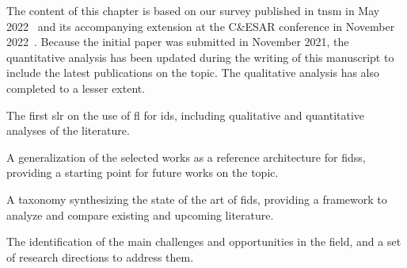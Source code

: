 The content of this chapter is based on our survey published in \gls{tnsm} in May 2022~\cite{lavaur_tnsm_2022} and its accompanying extension at the C\&ESAR conference in November 2022~\cite{lavaur_Federatedlearningenabler_2022}.
Because the initial paper was submitted in November 2021, the quantitative analysis has been updated during the writing of this manuscript to include the latest publications on the topic.
The qualitative analysis has also completed to a lesser extent.

\begin{contribs}
  \item The first \gls{slr} on the use of \gls{fl} for \gls{ids}, including qualitative and quantitative analyses of the literature.
  \item A generalization of the selected works as a reference architecture for \glspl{fids}, providing a starting point for future works on the topic.
  \item A taxonomy synthesizing the state of the art of \gls{fids}, providing a framework to analyze and compare existing and upcoming literature.
  \item The identification of the main challenges and opportunities in the field, and a set of research directions to address them.
\end{contribs}

